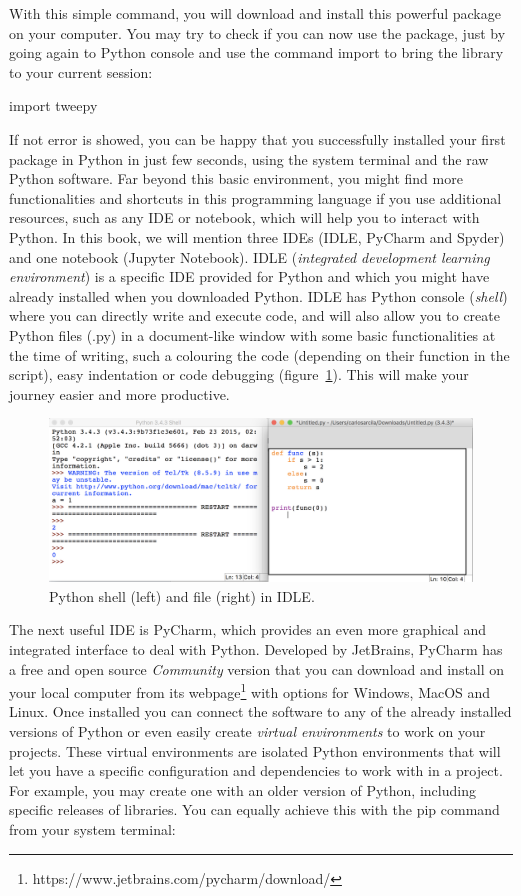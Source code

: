 With this simple command, you will download and install this powerful package on your computer. You may try to check if you can now use the package, just by going again to Python console and use the command import to bring the library to your current session:

\begin{examplepy}
import tweepy
\end{examplepy}

If not error is showed, you can be happy that you successfully installed your first package in Python in just few seconds, using the system terminal and the raw Python software. Far beyond this basic environment, you might find more functionalities and shortcuts in this programming language if you use additional resources, such as any IDE or notebook, which will help you to interact with Python. In this book, we will mention three IDEs (IDLE, PyCharm and Spyder) and one notebook (Jupyter Notebook). IDLE (\textit{integrated development learning environment}) is a specific IDE provided for Python and which you might have already installed when you downloaded Python. IDLE has Python console (\textit{shell}) where you can directly write and execute code, and will also allow you to create Python files (.py) in a document-like window with some basic functionalities at the time of writing, such a colouring the code (depending on their function in the script), easy indentation or code debugging (figure~\ref{fig:python_idle}).  This will make your journey easier and more productive. 

\begin{figure}
\centering
\includegraphics[width=0.9\linewidth]{figures/ch3_python_idle}
\caption{Python shell (left) and file (right) in IDLE.}
\label{fig:python_idle}
\end{figure}

The next useful IDE is PyCharm, which provides an even more graphical and integrated interface to deal with Python.  Developed by JetBrains, PyCharm has a free and open source \textit{Community} version that you can download and install on your local computer from its webpage\footnote{https://www.jetbrains.com/pycharm/download/} with options for 	Windows, MacOS and Linux. Once installed you can connect the software to any of the already installed versions of Python or even easily create \textit{virtual environments} to work on your projects. These virtual environments are isolated Python environments that will let you have a specific configuration and dependencies to work with in a project. For example, you may create one with an older version of Python, including specific releases of libraries.  You can equally achieve this with the pip command from your system terminal:

